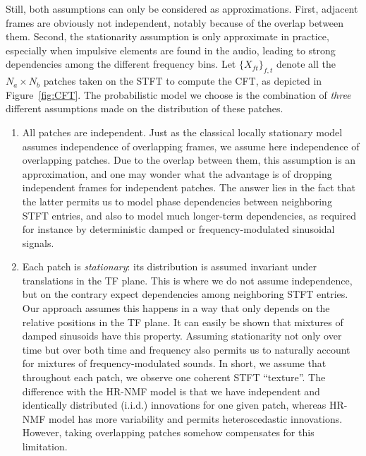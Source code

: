 {{Still, both assumptions can only be considered as approximations.
First, adjacent frames are obviously not independent, notably because
of the overlap between them. Second, the stationarity assumption is
only approximate in practice, especially when impulsive elements are
found in the audio, leading to strong dependencies among the different
frequency bins. Let $\{ X_{ft}\} _{f,t}$
denote all the $N_{a}\times N_{b}$ patches taken on the STFT to compute
the CFT, as depicted in Figure~\ref{fig:CFT}. The probabilistic
model we choose is the combination of \emph{three} different assumptions
made on the distribution of these patches.

\begin{enumerate}[leftmargin=0cm,itemindent=.5cm,labelwidth=\itemindent,labelsep=0cm,align=left]
\item All patches are independent. Just as the classical locally stationary
model~\cite{liutkus11t} assumes independence of overlapping frames,
we assume here independence of overlapping patches. Due to the
overlap between them, this assumption is an approximation,
and one may wonder what the advantage is of dropping independent frames
for independent patches. The answer lies in the fact that the latter
permits us to model phase dependencies between neighboring STFT entries,
and also to model much longer-term dependencies, as required for instance
by deterministic damped or frequency-modulated sinusoidal signals.\label{enu:assumption_independent_patches}
\item Each patch is \emph{stationary}: its distribution
is assumed invariant under translations in the TF plane. This is where we do not assume independence, but on the contrary expect dependencies among neighboring STFT entries. Our approach assumes this happens in a way that only depends on the relative positions in
the TF plane. It can easily be shown that mixtures of
damped sinusoids have this property. Assuming stationarity not only over time but over both time and frequency
also permits us to naturally account for mixtures of frequency-modulated
sounds. In short, we assume that throughout each patch, we observe
one coherent STFT ``texture''. The difference with the HR-NMF model is that we have independent and identically
distributed (i.i.d.) innovations for one given patch, whereas HR-NMF model has more variability and permits heteroscedastic innovations. However, taking overlapping patches somehow compensates for
this limitation.\label{enu:assumption_stationary}

\end{enumerate}}}
